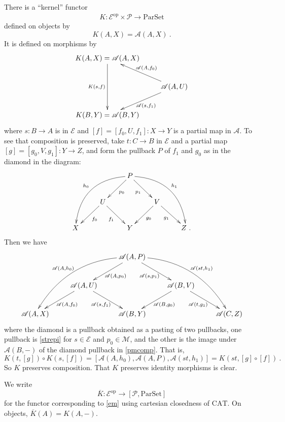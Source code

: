 \documentclass[a4paper,12pt,reqno]{amsart}
\theoremstyle{definition}
\theoremstyle{fact}
\theoremstyle{genquest}
\theoremstyle{step}
\newcommand{\lra}{\longrightarrow}
\def\CA{{\mathscr A}}
\def\CE{{\mathscr E}}
\def\CM{{\mathscr M}}
\def\CP{{\mathscr P}}
\begin{document}
There is a ``kernel'' functor 
\begin{eqnarray}\label{em}
K : \CE^{\mathrm{op}} \times \CP \lra \mathrm{Par}\mathrm{Set}
\end{eqnarray}
defined on objects by 
$$K(A,X) = \CA(A,X) \ .$$
It is defined on morphisms by
\begin{eqnarray}\label{strepi}
\begin{aligned}
\xymatrix{
K(A,X)=\CA(A,X) \ar[dd]_-{K(s,f)} \\
& \CA(A,U) \ar[lu]_-{\CA(A,f_0)} \ar[ld]^-{\CA(s,f_1)} \\
K(B,Y)=\CA(B,Y)}
\end{aligned}
\end{eqnarray}
where $s:B\lra A$ is in $\CE$ and $[f] = [f_0,U,f_1]:X\lra Y$ 
is a partial map in $\CA$. To see that composition is preserved, take $t:C\lra B$
in $\CE$ and a partial map $[g]=[g_0,V,g_1]:Y\lra Z$,
and form the pullback $P$ of $f_1$ and $g_0$ as in the diamond in the diagram: 
\begin{equation}\label{pmcomp}
\begin{aligned}
\xymatrix{
& & P \ar[ld]^-{p_0} \ar@/_2pc/[lldd]_-{h_0} \ar[rd]_-{p_1} \ar@/^2pc/[rrdd]^-{h_1} \\
& U \ar[ld]^-{f_0} \ar[rd]_-{f_1} & & V \ar[rd]_-{g_1} \ar[ld]^-{g_0} \\
X & & Y & & Z \ .}
\end{aligned}
\end{equation}
Then we have
\begin{equation}\label{Mcomp}
\begin{aligned}
\xymatrix{
& & \CA(A,P) \ar[ld]^-{\CA(A,p_0)} \ar@/_2pc/[lldd]_-{\CA(A,h_0)} \ar[rd]_-{\CA(s,p_1)} \ar@/^2pc/[rrdd]^-{\CA(st,h_1)} \\
& \CA(A,U) \ar[ld]^-{\CA(A,f_0)} \ar[rd]_-{\CA(s,f_1)} & & \CA(B,V) \ar[rd]_-{\CA(t,g_1)} \ar[ld]^-{\CA(B,g_0)} \\
\CA(A,X) & & \CA(B,Y) & & \CA(C,Z)}
\end{aligned}
\end{equation}
where the diamond is a pullback obtained as a pasting of two pullbacks, 
one pullback is \eqref{strepi} for $s\in \CE$ and $p_0\in \CM$, 
and the other is the image under $\CA(B,-)$ of the diamond pullback in \eqref{pmcomp}. 
That is,
$$K(t,[g])\circ K(s,[f])=[\CA(A,h_0),\CA(A,P),\CA(st,h_1)]=K(st,[g]\circ[f]) \ .$$
So $K$ preserves composition. That $K$ preserves identity morphisms is clear.

We write 
$$\overline{K} : \CE^{\mathrm{op}}  \lra [ \CP,\mathrm{Par}\mathrm{Set}]$$ 
for the functor corresponding to \eqref{em} using cartesian closedness of $\mathrm{CAT}$. On objects, $\overline{K}(A) = K(A,-)$.
\end{document}
